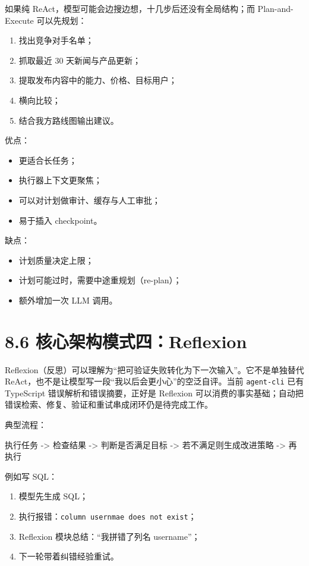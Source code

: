 如果纯 ReAct，模型可能会边搜边想，十几步后还没有全局结构；而 Plan-and-Execute 可以先规划：


\begin{enumerate}[leftmargin=2em]
\item 找出竞争对手名单；
\item 抓取最近 30 天新闻与产品更新；
\item 提取发布内容中的能力、价格、目标用户；
\item 横向比较；
\item 结合我方路线图输出建议。
\end{enumerate}

优点：


\begin{itemize}[leftmargin=2em]
\item 更适合长任务；
\item 执行器上下文更聚焦；
\item 可以对计划做审计、缓存与人工审批；
\item 易于插入 checkpoint。
\end{itemize}

缺点：


\begin{itemize}[leftmargin=2em]
\item 计划质量决定上限；
\item 计划可能过时，需要中途重规划（re-plan）；
\item 额外增加一次 LLM 调用。
\end{itemize}

\section{8.6 核心架构模式四：Reflexion}

Reflexion（反思）可以理解为``把可验证失败转化为下一次输入''。它不是单独替代 ReAct，也不是让模型写一段``我以后会更小心''的空泛自评。当前 \texttt{agent-cli} 已有 TypeScript 错误解析和错误摘要，正好是 Reflexion 可以消费的事实基础；自动把错误检索、修复、验证和重试串成闭环仍是待完成工作。


典型流程：


\begin{codeblock}
执行任务 -> 检查结果 -> 判断是否满足目标 -> 若不满足则生成改进策略 -> 再执行
\end{codeblock}

例如写 SQL：


\begin{enumerate}[leftmargin=2em]
\item 模型先生成 SQL；
\item 执行报错：\texttt{column usernmae does not exist}；
\item Reflexion 模块总结：``我拼错了列名 username''；
\item 下一轮带着纠错经验重试。
\end{enumerate}


